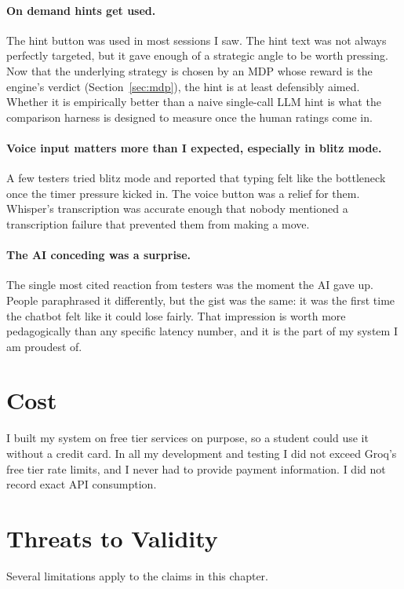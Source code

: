 \paragraph{On demand hints get used.}
The hint button was used in most sessions I saw. The hint text was not always perfectly targeted, but it gave enough of a strategic angle to be worth pressing. Now that the underlying strategy is chosen by an MDP whose reward is the engine's verdict (Section~\ref{sec:mdp}), the hint is at least defensibly aimed. Whether it is empirically better than a naive single-call LLM hint is what the comparison harness is designed to measure once the human ratings come in.

\paragraph{Voice input matters more than I expected, especially in blitz mode.}
A few testers tried blitz mode and reported that typing felt like the bottleneck once the timer pressure kicked in. The voice button was a relief for them. Whisper's transcription was accurate enough that nobody mentioned a transcription failure that prevented them from making a move.

\paragraph{The AI conceding was a surprise.}
The single most cited reaction from testers was the moment the AI gave up. People paraphrased it differently, but the gist was the same: it was the first time the chatbot felt like it could lose fairly. That impression is worth more pedagogically than any specific latency number, and it is the part of my system I am proudest of.

\section{Cost}
I built my system on free tier services on purpose, so a student could use it without a credit card. In all my development and testing I did not exceed Groq's free tier rate limits, and I never had to provide payment information. I did not record exact API consumption.

\section{Threats to Validity}
\label{sec:eval_threats}
Several limitations apply to the claims in this chapter.

